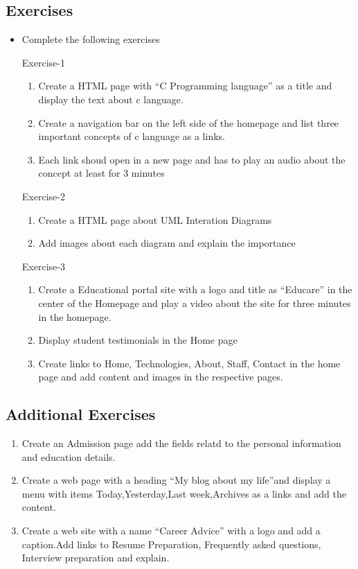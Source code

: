 \documentclass[11pt,a4paper]{article}
\begin{document}
\subsection*{Exercises}
\begin{itemize}
\item Complete the following  exercises

\item[Exercise-1]\
\begin{enumerate}[label=\bfseries Q\arabic*:]\itemsep10pt
\item Create a HTML page with ``C Programming language'' as a title and display the text about c language.
\item Create a navigation bar on the left side of the homepage and list three important concepts of c language as a links.
\item Each link shoud open in a new page and has to play an audio about the concept at least for 3 minutes
\end{enumerate}

\item[Exercise-2]\
\begin{enumerate}[label=\bfseries Q\arabic*:]\itemsep10pt
\item Create a HTML page about UML Interation Diagrams 
\item Add images about each diagram and explain the importance
\end{enumerate}

\item[Exercise-3]\
\begin{enumerate}[label=\bfseries Q\arabic*:]\itemsep10pt
\item Create a Educational portal site with a logo and title as ``Educare'' in the center of the Homepage and play a video about the site for three minutes in the homepage.
\item Display student testimonials in the Home page 
\item Create links to Home, Technologies, About, Staff, Contact in the home page and add content and images in the respective pages.
\end{enumerate}
\end{itemize}

\subsection*{Additional Exercises}
\begin{enumerate}
\item Create an Admission page add the fields relatd to the personal information and education details.
\item Create a web page with a heading ``My blog about my life''and display a menu with items Today,Yesterday,Last week,Archives as a links and add the content.
\item Create a web site with a name ``Career Advice'' with a logo and add a caption.Add links to Resume Preparation, Frequently asked questions, Interview preparation and explain.
\end{enumerate}
\end{document}
